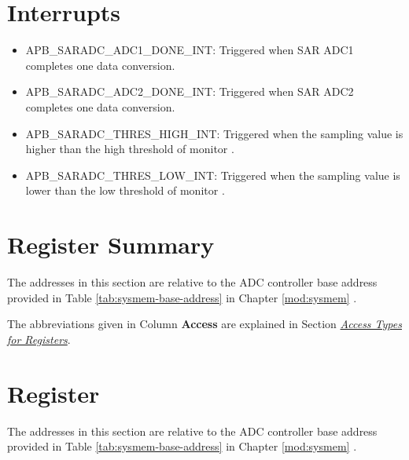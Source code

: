 \documentclass[main\_\_EN.tex]{subfiles}
\begin{document}
\section{Interrupts}

\begin{itemize}
   \item \label{int:SARADCDONEINT1} APB\_SARADC\_ADC1\_DONE\_INT: Triggered when SAR ADC1 completes one data conversion.
   \item \label{int:SARADCDONEINT2} APB\_SARADC\_ADC2\_DONE\_INT: Triggered when SAR ADC2 completes one data conversion.
   \item \label{int:APBSARADCTHRESxHIGHINT} APB\_SARADC\_THRES\_HIGH\_INT: Triggered when the sampling value is higher than the high threshold of monitor .
    \item \label{int:APBSARADCTHRESxLOWINT} APB\_SARADC\_THRES\_LOW\_INT: Triggered when the sampling value is lower than the low threshold of monitor .
\end{itemize}


\section{Register Summary}

The addresses in this section are relative to the ADC controller base address provided in Table \ref{tab:sysmem-base-address} in Chapter \ref{mod:sysmem} \textit{}.

The abbreviations given in Column \textbf{Access} are explained in Section \hyperref[glossary-access-types]{\textit{Access Types for Registers}}.



\section{Register}

The addresses in this section are relative to the ADC controller base address provided in Table \ref{tab:sysmem-base-address} in Chapter \ref{mod:sysmem} \textit{}.


\end{document}
